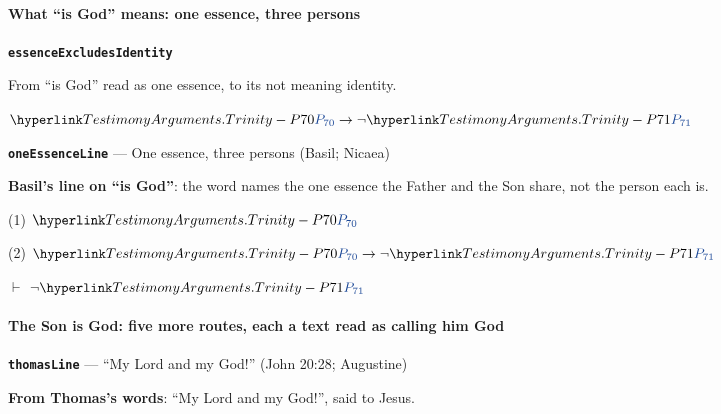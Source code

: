 \documentclass[11pt,paper=\testimonypaper,DIV=13,parskip=false]{scrartcl}
\begin{document}
\paragraph*{What “is God” means: one essence, three persons}
\leavevmode\par\nobreak
\par\medskip\noindent\textbf{\texttt{essence\allowbreak{}Excludes\allowbreak{}Identity}}\par\nobreak\noindent
From “is God” read as one essence, to its not meaning identity.

\begin{derivation}
  \item[] \(\pvar{TestimonyArguments.Trinity}{70} \rightarrow \lnot \pvar{TestimonyArguments.Trinity}{71}\)
\end{derivation}
\par\medskip\noindent\textbf{\texttt{one\allowbreak{}Essence\allowbreak{}Line}} --- One essence, three persons (Basil; Nicaea)\par\nobreak\noindent
\textbf{Basil’s line on “is God”}: the word names the one essence the Father and the Son share, not the person each is.

\begin{derivation}
  \item[(1)] \(\pvar{TestimonyArguments.Trinity}{70}\)
  \item[(2)] \(\pvar{TestimonyArguments.Trinity}{70} \rightarrow \lnot \pvar{TestimonyArguments.Trinity}{71}\)
  \item[\(\vdash\)] \(\lnot \pvar{TestimonyArguments.Trinity}{71}\)
\end{derivation}
\paragraph*{The Son is God: five more routes, each a text read as calling him God}
\leavevmode\par\nobreak
\par\medskip\noindent\textbf{\texttt{thomas\allowbreak{}Line}} --- “My Lord and my God!” (John 20:28; Augustine)\par\nobreak\noindent
\textbf{From Thomas’s words}: “My Lord and my God!”, said to Jesus.
\end{document}
